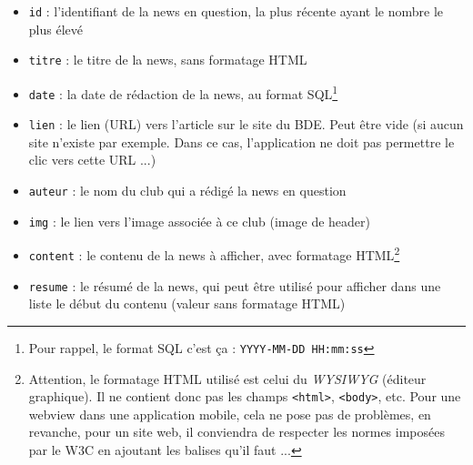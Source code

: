 \documentclass[12pt,a4paper,oneside]{report}
\begin{document}
\begin{itemize}
\item \texttt{id} : l'identifiant de la news en question, la plus récente ayant le nombre le plus élevé
\item \texttt{titre} : le titre de la news, sans formatage HTML
\item \texttt{date} : la date de rédaction de la news, au format SQL\footnote{Pour rappel, le format SQL c'est ça : \texttt{YYYY-MM-DD HH:mm:ss}}
\item \texttt{lien} : le lien (URL) vers l'article sur le site du BDE. Peut être vide (si aucun site n'existe par exemple. Dans ce cas, l'application ne doit pas permettre le clic vers cette URL ...)
\item \texttt{auteur} : le nom du club qui a rédigé la news en question
\item \texttt{img} : le lien vers l'image associée à ce club (image de header)
\item \texttt{content} : le contenu de la news à afficher, avec formatage HTML\footnote{Attention, le formatage HTML utilisé est celui du \textsl{WYSIWYG} (éditeur graphique). Il ne contient donc pas les champs \texttt{<html>}, \texttt{<body>}, etc. Pour une webview dans une application mobile, cela ne pose pas de problèmes, en revanche, pour un site web, il conviendra de respecter les normes imposées par le W3C en ajoutant les balises qu'il faut ...}
\item \texttt{resume} : le résumé de la news, qui peut être utilisé pour afficher dans une liste le début du contenu (valeur sans formatage HTML)

\end{itemize}
\end{document}
